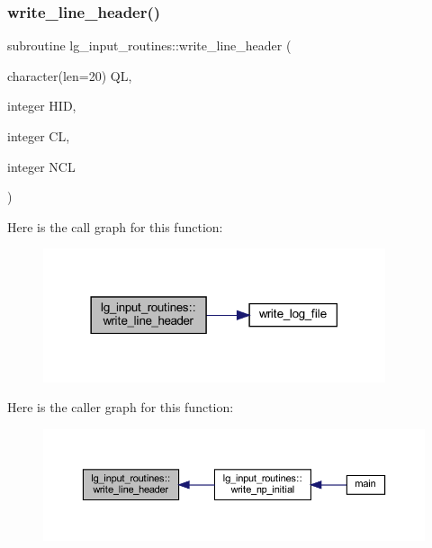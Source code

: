 \subsubsection{\texorpdfstring{write\+\_\+line\+\_\+header()}{write\_line\_header()}}
{\footnotesize\ttfamily subroutine lg\+\_\+input\+\_\+routines\+::write\+\_\+line\+\_\+header (\begin{DoxyParamCaption}\item[{character(len=20)}]{QL,  }\item[{integer}]{H\+ID,  }\item[{integer}]{CL,  }\item[{integer}]{N\+CL }\end{DoxyParamCaption})}

Here is the call graph for this function\+:\nopagebreak
\begin{figure}[H]
\begin{center}
\leavevmode
\includegraphics[width=285pt]{namespacelg__input__routines_abb4589f0c8ad2d2d88f0f52aac5462e6_cgraph}
\end{center}
\end{figure}
Here is the caller graph for this function\+:\nopagebreak
\begin{figure}[H]
\begin{center}
\leavevmode
\includegraphics[width=350pt]{namespacelg__input__routines_abb4589f0c8ad2d2d88f0f52aac5462e6_icgraph}
\end{center}
\end{figure}
\mbox{\label{namespacelg__input__routines_a1e34012960c952d22446828d97881001}} 
